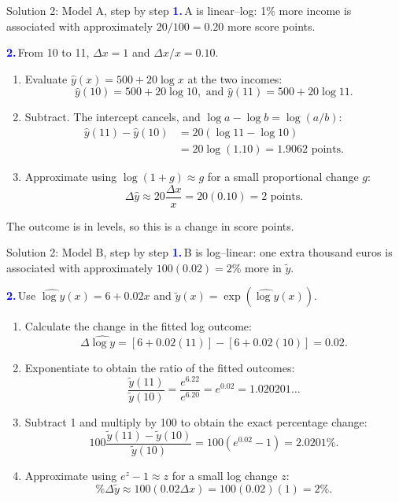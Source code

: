 \documentclass[notes,10pt, aspectratio=169]{beamer}
\newif\ifshowsolutions
\newcommand{\answerpart}[1]{\textcolor{blue}{\textbf{#1.}}\,}
\begin{document}
\ifshowsolutions
\begin{frame}{Solution 2: Model A, step by step}
\small
\answerpart{1}A is linear--log: 1\% more income is associated with approximately $20/100=0.20$ more score points.
\par\smallskip
\answerpart{2}From 10 to 11, $\Delta x=1$ and $\Delta x/x=0.10$.
\begin{enumerate}
\item Evaluate $\hat y(x)=500+20\log x$ at the two incomes:
\[
\hat y(10)=500+20\log10,\text{ and }\hat y(11)=500+20\log11.
\]
\item Subtract. The intercept cancels, and $\log a-\log b=\log(a/b)$:
\[
\begin{aligned}
\hat y(11)-\hat y(10)&=20(\log11-\log10)\\
&=20\log(1.10)=\boxed{1.9062\text{ points}}.
\end{aligned}
\]
\item Approximate using $\log(1+g)\approx g$ for a small proportional change $g$:
\[
\Delta\hat y\approx20\frac{\Delta x}{x}=20(0.10)=\boxed{2\text{ points}}.
\]
\end{enumerate}
The outcome is in levels, so this is a change in score points.
\end{frame}

\begin{frame}{Solution 2: Model B, step by step}
\small
\setlength{\abovedisplayskip}{4pt}
\setlength{\belowdisplayskip}{4pt}
\answerpart{1}B is log--linear: one extra thousand euros is associated with approximately $100(0.02)=2$\% more in $\tilde y$.
\par\smallskip
\answerpart{2}Use $\widehat{\log y}(x)=6+0.02x$ and $\tilde y(x)=\exp(\widehat{\log y}(x))$.
\begin{enumerate}
\item Calculate the change in the fitted log outcome:
\[
\Delta\widehat{\log y}=[6+0.02(11)]-[6+0.02(10)]=0.02.
\]
\item Exponentiate to obtain the ratio of the fitted outcomes:
\[
\frac{\tilde y(11)}{\tilde y(10)}=\frac{e^{6.22}}{e^{6.20}}=e^{0.02}=1.020201\ldots
\]
\item Subtract 1 and multiply by 100 to obtain the exact percentage change:
\[
100\frac{\tilde y(11)-\tilde y(10)}{\tilde y(10)}
=100(e^{0.02}-1)=\boxed{2.0201\%}.
\]
\item Approximate using $e^z-1\approx z$ for a small log change $z$:
\[
\%\Delta\tilde y\approx100(0.02\Delta x)=100(0.02)(1)=\boxed{2\%}.
\]
\end{enumerate}
\end{frame}
\end{document}
